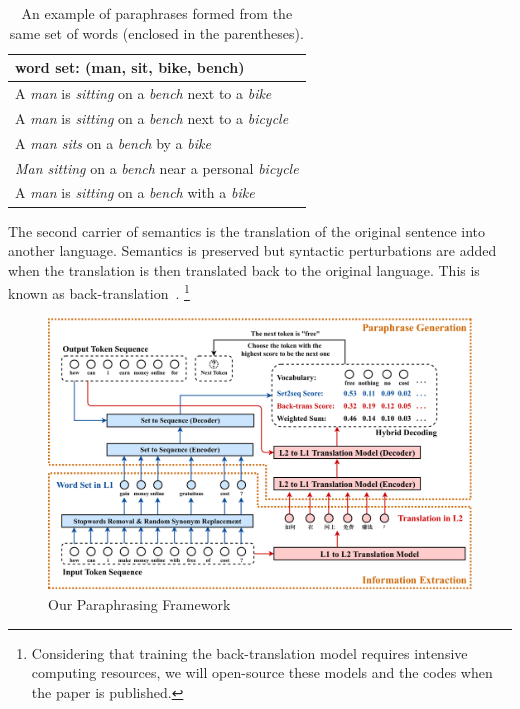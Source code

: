 \begin{table}[th]
\small
\centering
\begin{tabular}{l}
\hline 
word set: \textbf{(man, sit, bike, bench)} \\
\hline
A \textit{\color{red}man} is \textit{\color{red}sitting} on a \textit{\color{red}bench} next to a \textit{\color{red}bike} \\
A \textit{\color{red}man} is \textit{\color{red}sitting} on a \textit{\color{red}bench} next to a \textit{\color{red}bicycle} \\
A \textit{\color{red}man sits} on a \textit{\color{red}bench} by a \textit{\color{red}bike} \\
\textit{\color{red}Man sitting} on a \textit{\color{red}bench} near a personal \textit{\color{red}bicycle} \\
A \textit{\color{red}man} is \textit{\color{red}sitting} on a \textit{\color{red}bench} with a \textit{\color{red}bike} \\
\hline
\end{tabular}
\caption{\label{para-example} An example of paraphrases formed
from the same set of words (enclosed in the parentheses).} 
\end{table}


The second carrier of semantics is the translation of the 
original sentence into another language. 
Semantics is preserved but syntactic perturbations are added 
when the translation is then translated back to the 
original language. This is known as back-translation~\cite{wieting2017paranmt}. 
\footnote{Considering that training the back-translation model requires 
intensive computing resources, we will open-source these models and the codes
when the paper is published.}

\begin{figure}[h]
\centering
\includegraphics[width=1.6\columnwidth]{Paraphrase.pdf}
\caption{Our Paraphrasing Framework}
\label{fig:app}
\end{figure}
 

